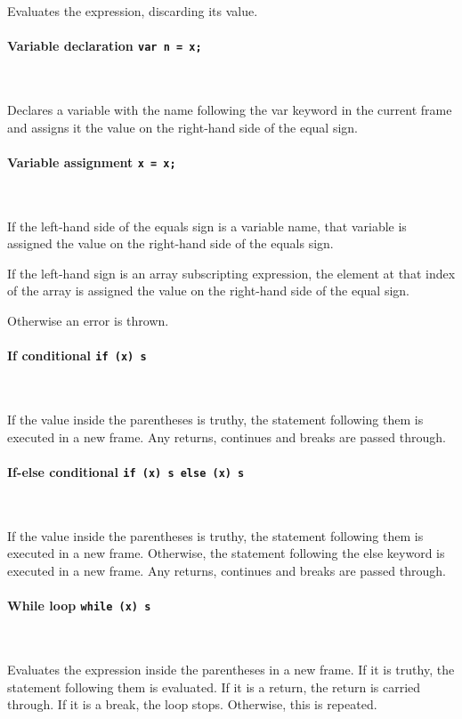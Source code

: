Evaluates the expression, discarding its value.

\paragraph{Variable declaration \quad \texttt{var n = x;} } \

Declares a variable with the name following the var keyword in the current frame and assigns it the value on the right-hand side of the equal sign.

\paragraph{Variable assignment \quad \texttt{x = x;} } \

If the left-hand side of the equals sign is a variable name, that variable is assigned the value on the right-hand side of the equals sign.

If the left-hand sign is an array subscripting expression, the element at that index of the array is assigned the value on the right-hand side of the equal sign.

Otherwise an error is thrown.

\paragraph{If conditional \quad \texttt{if (x) s} } \

If the value inside the parentheses is truthy, the statement following them is executed in a new frame. Any returns, continues and breaks are passed through.

\paragraph{If-else conditional \quad \texttt{if (x) s else (x) s} } \

If the value inside the parentheses is truthy, the statement following them is executed in a new frame. Otherwise, the statement following the else keyword is executed in a new frame. Any returns, continues and breaks are passed through.

\paragraph{While loop \quad \texttt{while (x) s}} \

Evaluates the expression inside the parentheses in a new frame. If it is truthy, the statement following them is evaluated. If it is a return, the return is carried through. If it is a break, the loop stops. Otherwise, this is repeated.

